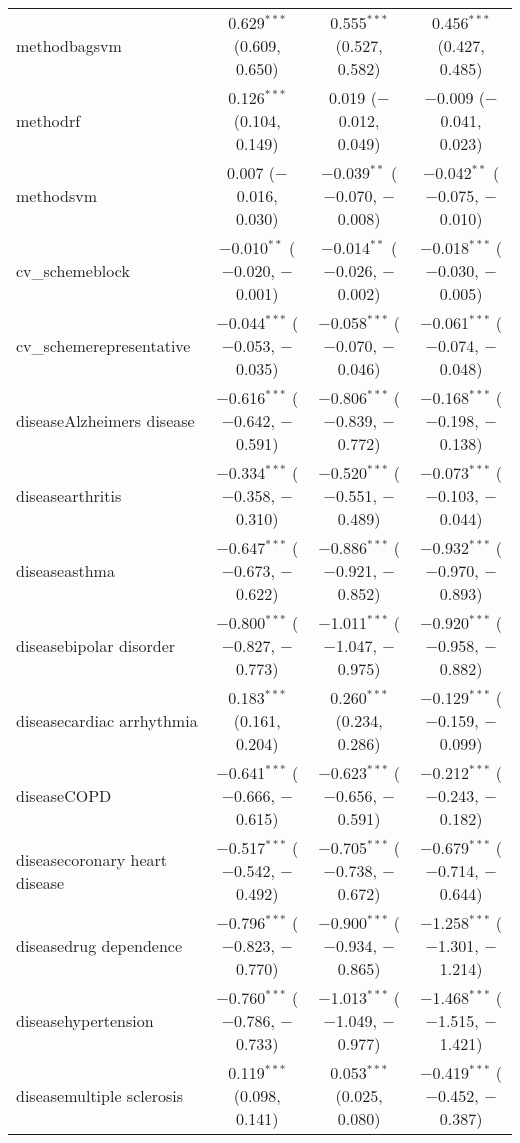 \begin{table}[!htbp]
\begin{tabular}{@{\extracolsep{5pt}}lccc}
  methodbagsvm & 0.629$^{***}$ (0.609, 0.650) & 0.555$^{***}$ (0.527, 0.582) & 0.456$^{***}$ (0.427, 0.485) \\ 
  methodrf & 0.126$^{***}$ (0.104, 0.149) & 0.019 ($-$0.012, 0.049) & $-$0.009 ($-$0.041, 0.023) \\ 
  methodsvm & 0.007 ($-$0.016, 0.030) & $-$0.039$^{**}$ ($-$0.070, $-$0.008) & $-$0.042$^{**}$ ($-$0.075, $-$0.010) \\ 
  cv\_schemeblock & $-$0.010$^{**}$ ($-$0.020, $-$0.001) & $-$0.014$^{**}$ ($-$0.026, $-$0.002) & $-$0.018$^{***}$ ($-$0.030, $-$0.005) \\ 
  cv\_schemerepresentative & $-$0.044$^{***}$ ($-$0.053, $-$0.035) & $-$0.058$^{***}$ ($-$0.070, $-$0.046) & $-$0.061$^{***}$ ($-$0.074, $-$0.048) \\ 
  diseaseAlzheimers disease & $-$0.616$^{***}$ ($-$0.642, $-$0.591) & $-$0.806$^{***}$ ($-$0.839, $-$0.772) & $-$0.168$^{***}$ ($-$0.198, $-$0.138) \\ 
  diseasearthritis & $-$0.334$^{***}$ ($-$0.358, $-$0.310) & $-$0.520$^{***}$ ($-$0.551, $-$0.489) & $-$0.073$^{***}$ ($-$0.103, $-$0.044) \\ 
  diseaseasthma & $-$0.647$^{***}$ ($-$0.673, $-$0.622) & $-$0.886$^{***}$ ($-$0.921, $-$0.852) & $-$0.932$^{***}$ ($-$0.970, $-$0.893) \\ 
  diseasebipolar disorder & $-$0.800$^{***}$ ($-$0.827, $-$0.773) & $-$1.011$^{***}$ ($-$1.047, $-$0.975) & $-$0.920$^{***}$ ($-$0.958, $-$0.882) \\ 
  diseasecardiac arrhythmia & 0.183$^{***}$ (0.161, 0.204) & 0.260$^{***}$ (0.234, 0.286) & $-$0.129$^{***}$ ($-$0.159, $-$0.099) \\ 
  diseaseCOPD & $-$0.641$^{***}$ ($-$0.666, $-$0.615) & $-$0.623$^{***}$ ($-$0.656, $-$0.591) & $-$0.212$^{***}$ ($-$0.243, $-$0.182) \\ 
  diseasecoronary heart disease & $-$0.517$^{***}$ ($-$0.542, $-$0.492) & $-$0.705$^{***}$ ($-$0.738, $-$0.672) & $-$0.679$^{***}$ ($-$0.714, $-$0.644) \\ 
  diseasedrug dependence & $-$0.796$^{***}$ ($-$0.823, $-$0.770) & $-$0.900$^{***}$ ($-$0.934, $-$0.865) & $-$1.258$^{***}$ ($-$1.301, $-$1.214) \\ 
  diseasehypertension & $-$0.760$^{***}$ ($-$0.786, $-$0.733) & $-$1.013$^{***}$ ($-$1.049, $-$0.977) & $-$1.468$^{***}$ ($-$1.515, $-$1.421) \\ 
  diseasemultiple sclerosis & 0.119$^{***}$ (0.098, 0.141) & 0.053$^{***}$ (0.025, 0.080) & $-$0.419$^{***}$ ($-$0.452, $-$0.387) \\ 

\end{tabular}
\end{table}
